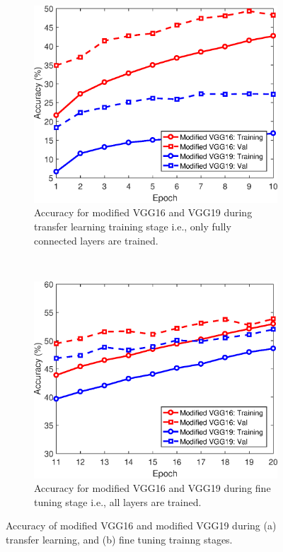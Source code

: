 \documentclass[10pt,twocolumn,letterpaper]{article}
\begin{document}
\begin{figure}[t!]
	\centering
	\begin{subfigure}[h!]{0.5\textwidth}
		\includegraphics[width=\linewidth]{figs/course_acc_vgg16_vgg19.eps}
		\caption{Accuracy for modified VGG16 and VGG19 during transfer learning training stage i.e., only fully connected layers are trained.}
		\label{fig:course}
	\end{subfigure}%
	~ %
	\begin{subfigure}[h!]{0.5\textwidth}
		\includegraphics[width=\linewidth]{figs/fine_acc_vgg16_vgg19.eps}
		\caption{Accuracy for modified VGG16 and VGG19 during fine tuning stage i.e., all layers are trained.}
		\label{fig:fine}
	\end{subfigure}
	\caption{Accuracy of modified VGG16 and modified VGG19 during (a) transfer learning, and (b) fine tuning trainng stages.}\label{fig:acc_vgg16_vgg19}
\end{figure}
\end{document}
